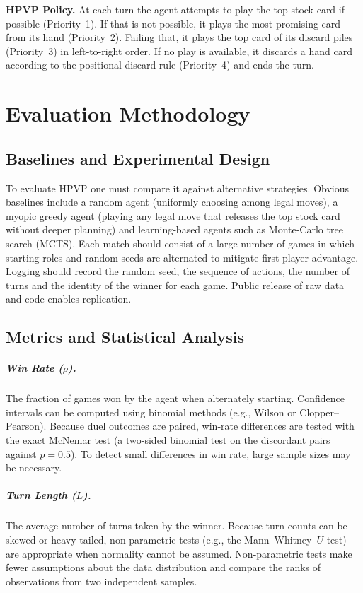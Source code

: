 \documentclass[twoside]{mitthesis}
\begin{document}
\noindent\textbf{HPVP Policy.}  At each turn the agent attempts to play the top stock card if possible (Priority 1).  If that is not possible, it plays the most promising card from its hand (Priority 2).  Failing that, it plays the top card of its discard piles (Priority 3) in left‑to‑right order.  If no play is available, it discards a hand card according to the positional discard rule (Priority 4) and ends the turn.

\chapter{Evaluation Methodology}
\section{Baselines and Experimental Design}
To evaluate HPVP one must compare it against alternative strategies.  Obvious baselines include a random agent (uniformly choosing among legal moves), a myopic greedy agent (playing any legal move that releases the top stock card without deeper planning) and learning‑based agents such as Monte‑Carlo tree search (MCTS).  Each match should consist of a large number of games in which starting roles and random seeds are alternated to mitigate first‑player advantage.  Logging should record the random seed, the sequence of actions, the number of turns and the identity of the winner for each game.  Public release of raw data and code enables replication.

\section{Metrics and Statistical Analysis}
\paragraph{Win Rate ($\rho$).}  The fraction of games won by the agent when alternately starting.  Confidence intervals can be computed using binomial methods (e.g., Wilson or Clopper–Pearson). Because duel outcomes are paired, win‑rate differences are tested with the exact McNemar test (a two‑sided binomial test on the discordant pairs against $p=0.5$).  To detect small differences in win rate, large sample sizes may be necessary.

\paragraph{Turn Length ($\bar{L}$).}  The average number of turns taken by the winner.  Because turn counts can be skewed or heavy‑tailed, non‑parametric tests (e.g., the Mann–Whitney $U$ test) are appropriate when normality cannot be assumed.  Non‑parametric tests make fewer assumptions about the data distribution and compare the ranks of observations from two independent samples.
\end{document}
